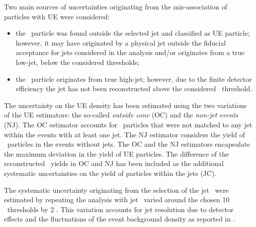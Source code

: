 Two main sources of uncertainties originating from the mis-association of \Vzero particles with UE were considered:
\begin{itemize}
\item the \Vzero\ particle was found outside the selected jet and classified as UE particle; however, it may have originated by a physical jet outside the fiducial acceptance for jets considered in the analysis and/or originates from a true low-\pt jet, below the considered thresholds;
\item the \Vzero\ particle originates from true high-\pt jet; however, due to the finite detector efficiency the jet has not been reconstructed above the considered \pt\ threshold.
\end{itemize}
The uncertainty on the UE \Vzero density has been estimated using the two variations of the UE estimators: the so-called {\it outside cone} (OC) and the {\it non-jet events} (NJ).
The OC estimator accounts for \Vzero\ particles that were not matched to any jet within the events with at least one jet. The NJ estimator considers the yield of \Vzero\ particles in the events without jets. The OC and the NJ estimators encapsulate the maximum deviation in the yield of UE particles. The difference of the reconstructed \Vzero\ yields in OC and NJ has been included as the additional systematic uncertainties on the yield of particles within the jets (JC).



The systematic uncertainty originating from the selection of the jet \pt\ were estimated by repeating the analysis with jet \pt\ varied around the chosen 10 \gevc\ thresholds by 2 \gevc. This variation accounts for jet resolution due to detector effects and the fluctuations of the event background density as reported in \cite{Adam:2015hoa}. %


